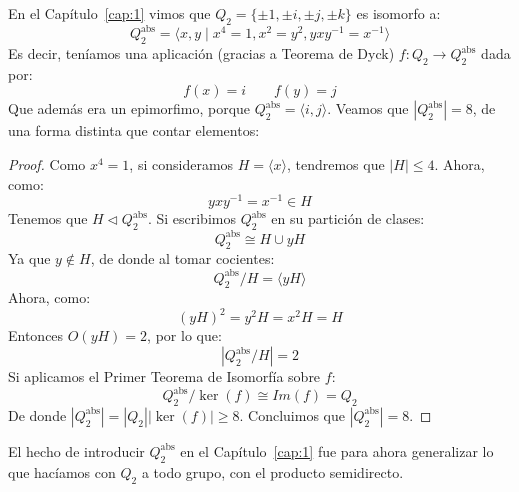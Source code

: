 \begin{ejemplo}
    En el Capítulo~\ref{cap:1} vimos que $Q_2 = \{\pm 1, \pm i, \pm j, \pm k\}$ es isomorfo a:
    \begin{equation*}
        Q_2^{\text{abs}} = \langle x,y\mid x^4=1, x^2=y^2, yxy^{-1} = x^{-1} \rangle 
    \end{equation*}
    Es decir, teníamos una aplicación (gracias a Teorema de Dyck) $f:Q_2\to Q_2^{\text{abs}}$ dada por:
    \begin{equation*}
        f(x) = i \qquad f(y) = j
    \end{equation*}
    Que además era un epimorfimo, porque $Q_2^{\text{abs}} = \langle i,j \rangle $. Veamos que $|Q_2^{\text{abs}}| = 8$, de una forma distinta que contar elementos:
    \begin{proof} %
        Como $x^4 = 1$, si consideramos $H = \langle x \rangle $, tendremos que $|H| \leq 4$. Ahora, como:
        \begin{equation*}
            yxy^{-1} = x^{-1}\in H 
        \end{equation*}
        Tenemos que $H\lhd Q_2^{\text{abs}}$. Si escribimos $Q_2^{\text{abs}}$ en su partición de clases:
        \begin{equation*}
            Q_2^{\text{abs}} \cong H\cup yH
        \end{equation*}
        Ya que $y\notin H$, de donde al tomar cocientes:
        \begin{equation*}
            Q_2^{\text{abs}}/H = \langle yH \rangle 
        \end{equation*}
        Ahora, como:
        \begin{equation*}
            {(yH)}^{2} = y^2H = x^2H = H
        \end{equation*}
        Entonces $O(yH) = 2$, por lo que:
        \begin{equation*}
            |Q_2^{\text{abs}}/H| = 2
        \end{equation*}
        Si aplicamos el Primer Teorema de Isomorfía sobre $f$:
        \begin{equation*}
            Q_2^{\text{abs}}/\ker(f) \cong Im(f) = Q_2
        \end{equation*}
        De donde $|Q_2^{\text{abs}}| = |Q_2||\ker(f)| \geq 8$. Concluimos que $|Q_2^{\text{abs}}| = 8$.
    \end{proof}
\end{ejemplo}

\noindent
El hecho de introducir $Q_2^{\text{abs}}$ en el Capítulo~\ref{cap:1} fue para ahora generalizar lo que hacíamos con $Q_2$ a todo grupo, con el producto semidirecto.

